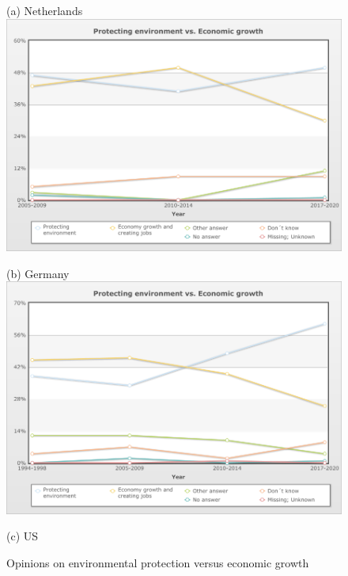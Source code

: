 \documentclass[12pt]{article}
\begin{document}
\begin{figure}[h!!]	
	\centering
	\caption{Opinions on environmental protection versus economic growth}\label{fig:WVS}
	\begin{minipage}[h!!]{0.4\textwidth}  
		\centering\footnotesize{(a) Netherlands}
		\includegraphics[width=1\textwidth]{../Data/data_Netherlands_priorities.png}
	\end{minipage}
	\begin{minipage}[h!!]{0.4\textwidth}  
		\centering\footnotesize{(b) Germany}
		\includegraphics[width=1\textwidth]{../Data/data_germany_priorities.png}
	\end{minipage}
	\begin{minipage}[h!!]{0.4\textwidth}  
		\centering\footnotesize{(c) US}

\end{minipage}
\end{figure}
\end{document}
